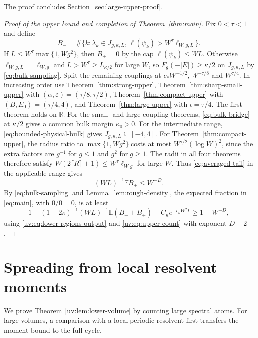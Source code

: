 \documentclass[11pt]{article}
\numberwithin{equation}{section}
\theoremstyle{remark}
\newcommand{\E}{\mathbb E}
\newcommand{\R}{\mathbb R}
\newcommand{\ellscale}{\ell_{W,g}}
\newcommand{\ellstar}{\ell_{W,g,L}}
\begin{document}
The proof concludes Section~\ref{sec:large-upper-proof}.

\begin{proof}[Proof of the upper bound and completion of Theorem~\ref{thm:main}]
Fix $0<\tau<1$ and define
\[
 B_+=\#\{k:\lambda_k\in J_{g,\kappa,L},\ \ell(\psi_k)>W^\tau\ellstar\}.
\]
If $L\le W^\tau\max\{1,Wg^2\}$, then $B_+=0$ by the cap $\ell(\psi_k)\le WL$.
Otherwise $\ellstar=\ellscale$ and $L>W^\tau\ge L_{\kappa/2}$ for large $W$,
so $F_g(-|E|)\ge\kappa/2$ on $J_{g,\kappa,L}$ by \eqref{eq:bulk-sampling}.
Split the remaining couplings at $c_*W^{-1/2}$, $W^{-\tau/8}$ and
$W^{\tau/4}$. In increasing order use Theorem~\ref{thm:strong-upper},
Theorem~\ref{thm:sharp-small-upper} with $(\alpha,\varepsilon)=(\tau/8,\tau/2)$,
Theorem~\ref{thm:compact-upper} with $(B,E_0)=(\tau/4,4)$, and
Theorem~\ref{thm:large-upper} with $\epsilon=\tau/4$.
The first theorem holds on $\R$. For the small- and large-coupling
theorems, \eqref{eq:bulk-bridge} at $\kappa/2$ gives a common bulk margin
$\kappa_0>0$. For the intermediate range, \eqref{eq:bounded-physical-bulk}
gives $J_{g,\kappa,L}\subseteq[-4,4]$.
For Theorem~\ref{thm:compact-upper}, the radius ratio to $\max\{1,Wg^2\}$ costs
at most $W^{\tau/2}(\log W)^2$, since the extra factors are
$g^{-4}$ for $g\le1$ and $g^2$ for $g\ge1$.
The radii in all four theorems therefore satisfy
$W(2\lceil R\rceil+1)\le W^\tau\ellscale$ for large $W$.
Thus \eqref{eq:averaged-tail} in the applicable range gives
\begin{equation}\label{uv:eq:upper-count}
 (WL)^{-1}\E B_+\le W^{-D}.
\end{equation}
By \eqref{eq:bulk-sampling} and Lemma~\ref{lem:rough-density}, the
expected fraction in \eqref{eq:main}, with $0/0=0$, is at least
\begin{equation}\label{uv:eq:sampling}
 1-(1-2\kappa)^{-1}(WL)^{-1}\E(B_-+B_+)
   -C_\kappa e^{-c_\kappa W^2L}\ge1-W^{-D},
\end{equation}
using \eqref{uv:eq:lower-regions-output} and \eqref{uv:eq:upper-count}
with exponent $D+2$.
\end{proof}

\section{Spreading from local resolvent moments}
\label{sec:unrestricted}\label{uv:sec:local-resolvents}
We prove Theorem~\ref{uv:lem:lower-volume} by counting large spectral
atoms. For large volumes, a comparison with a local periodic resolvent
first transfers the moment bound to the full cycle.
\end{document}
